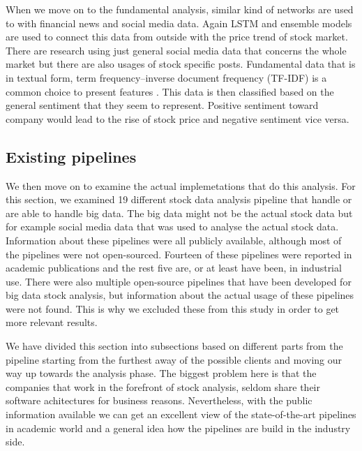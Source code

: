 When we move on to the fundamental analysis, similar kind of networks are used to with financial news and social media data.
Again LSTM and ensemble models are used to connect this data from outside with the price trend of stock market.
There are research using just general social media data that concerns the whole market but there are also usages of stock specific posts.
Fundamental data that is in textual form, term frequency–inverse document frequency (TF-IDF) is a common choice to present features \cite{chungho}.
This data is then classified based on the general sentiment that they seem to represent.
Positive sentiment toward company would lead to the rise of stock price and negative sentiment vice versa.

\subsection{Existing pipelines}

We then move on to examine the actual implemetations that do this analysis.
For this section, we examined 19 different stock data analysis pipeline that handle or are able to handle big data.
The big data might not be the actual stock data but for example social media data that was used to analyse the actual stock data.
Information about these pipelines were all publicly available, although most of the pipelines were not open-sourced.
Fourteen of these pipelines were reported in academic publications and the rest five are, or at least have been, in industrial use.
There were also multiple open-source pipelines that have been developed for big data stock analysis, but information about the actual usage of these pipelines were not found.
This is why we excluded these from this study in order to get more relevant results.

We have divided this section into subsections based on different parts from the pipeline starting from the furthest away of the possible clients and moving our way up towards the analysis phase.
The biggest problem here is that the companies that work in the forefront of stock analysis, seldom share their software achitectures for business reasons.
Nevertheless, with the public information available we can get an excellent view of the state-of-the-art pipelines in academic world and a general idea how the pipelines are build in the industry side.

